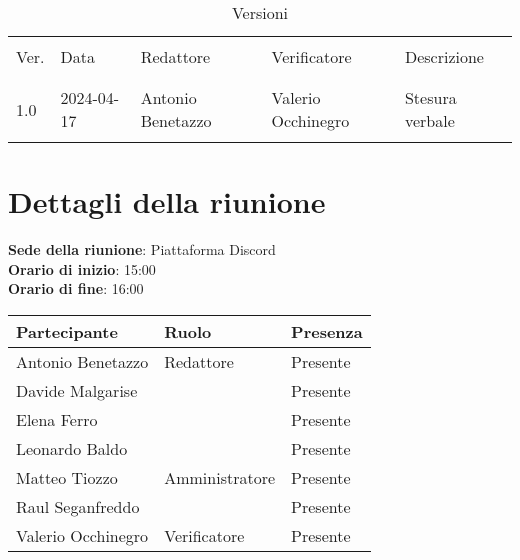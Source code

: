 \documentclass[italian,12pt]{article}
\begin{document}


\newpage



\begin{table}[!h]
	\caption{Versioni}
	\footnotesize
	\begin{center}
		\begin{tabular}{ l l l l l }
			\hline                                                                              \\[-2ex]
			Ver. & Data       & Redattore          & Verificatore       & Descrizione           \\
			\\[-2ex] \hline \\[-1.5ex]
			1.0  & 2024-04-17 & Antonio Benetazzo  & Valerio Occhinegro & Stesura verbale       \\
			\\[-1.5ex] \hline
		\end{tabular}
	\end{center}
\end{table}

\newpage

\tableofcontents

\newpage

\section{Dettagli della riunione}


\textbf{Sede della riunione}: Piattaforma Discord\\
\textbf{Orario di inizio}: 15:00\\
\textbf{Orario di fine}: 16:00\\


\begin{flushleft}
	\begin{table}[!h]
	\begin{tabular}{ |l|l|l| } 
		\hline
		\textbf{Partecipante} & \textbf{Ruolo}       & \textbf{Presenza} \\
		\hline 
		Antonio Benetazzo     & Redattore            & Presente          \\
		Davide Malgarise      &                      & Presente          \\
		Elena Ferro           &                      & Presente          \\
		Leonardo Baldo        &                      & Presente          \\
		Matteo Tiozzo         & Amministratore       & Presente          \\
		Raul Seganfreddo      &                      & Presente          \\
		Valerio Occhinegro    & Verificatore         & Presente          \\
		\hline
	\end{tabular}
	\end{table}
\end{flushleft}
\end{document}
